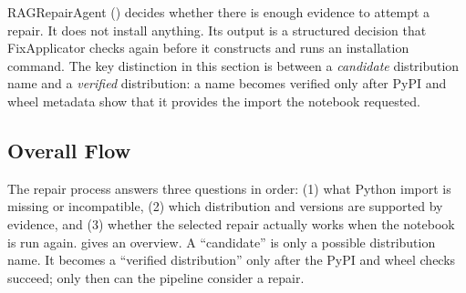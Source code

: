 RAGRepairAgent () decides whether there is enough
evidence to attempt a repair. It does not install anything. Its output is a
structured decision that FixApplicator checks again before it constructs and
runs an installation command. The key distinction in this section is between a
\emph{candidate} distribution name and a \emph{verified} distribution: a name
becomes verified only after PyPI and wheel metadata show that it provides the
import the notebook requested.

\subsection{Overall Flow}

The repair process answers three questions in order: (1) what Python import is
missing or incompatible, (2) which distribution and versions are supported by
evidence, and (3) whether the selected repair actually works when the notebook
is run again.  gives an overview. A “candidate” is only
a possible distribution name. It becomes a “verified distribution” only after
the PyPI and wheel checks succeed; only then can the pipeline consider a repair.

